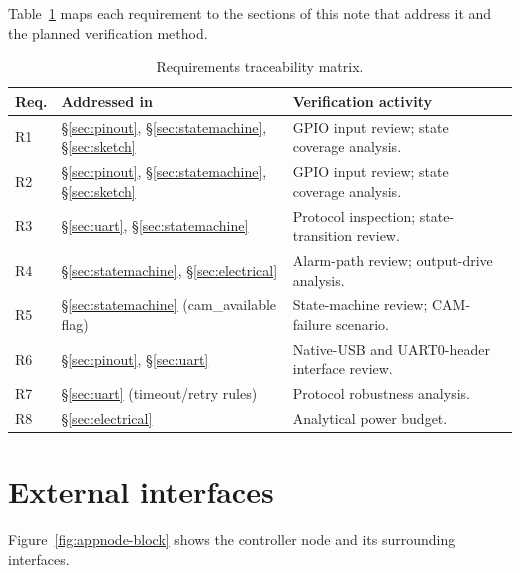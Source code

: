 \documentclass[11pt,a4paper]{article}
\begin{document}
Table~\ref{tab:traceability} maps each requirement to the sections of this note
that address it and the planned verification method.

\begin{table}[H]
    \centering
    \caption{Requirements traceability matrix.}
    \label{tab:traceability}
    \begin{tabular}{>{\raggedright\arraybackslash}p{1.0cm} >{\raggedright\arraybackslash}p{4.4cm} >{\raggedright\arraybackslash}p{5.4cm}}
        \toprule
        \textbf{Req.} & \textbf{Addressed in} & \textbf{Verification activity} \\
        \midrule
        R1 & \S\ref{sec:pinout}, \S\ref{sec:statemachine}, \S\ref{sec:sketch} & GPIO input review; state coverage analysis. \\
        R2 & \S\ref{sec:pinout}, \S\ref{sec:statemachine}, \S\ref{sec:sketch} & GPIO input review; state coverage analysis. \\
        R3 & \S\ref{sec:uart}, \S\ref{sec:statemachine} & Protocol inspection; state-transition review. \\
        R4 & \S\ref{sec:statemachine}, \S\ref{sec:electrical} & Alarm-path review; output-drive analysis. \\
        R5 & \S\ref{sec:statemachine} (cam\_available flag) & State-machine review; CAM-failure scenario. \\
        R6 & \S\ref{sec:pinout}, \S\ref{sec:uart} & Native-USB and UART0-header interface review. \\
        R7 & \S\ref{sec:uart} (timeout/retry rules) & Protocol robustness analysis. \\
        R8 & \S\ref{sec:electrical} & Analytical power budget. \\
        \bottomrule
    \end{tabular}
\end{table}

\section{External interfaces}
\label{sec:interfaces}

Figure~\ref{fig:appnode-block} shows the controller node and its surrounding
interfaces.
\end{document}
